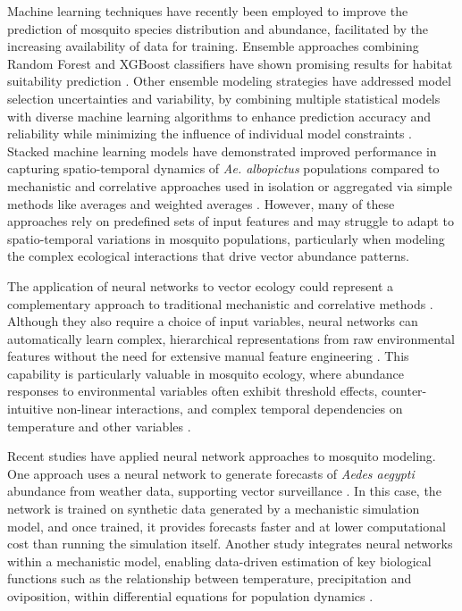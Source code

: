 \documentclass[preprint,12pt]{elsarticle}
\begin{document}
Machine learning techniques have recently been employed to improve the prediction of mosquito species distribution and abundance, facilitated by the increasing availability of data for training. Ensemble approaches combining Random Forest and XGBoost classifiers have shown promising results for habitat suitability prediction \cite{Georgiades2023}. Other ensemble modeling strategies have addressed model selection uncertainties and variability, by combining multiple statistical models with diverse machine learning algorithms to enhance prediction accuracy and reliability while minimizing the influence of individual model constraints \cite{Taheri2025}. Stacked machine learning models have demonstrated improved performance in capturing spatio-temporal dynamics of \emph{Ae. albopictus} populations compared to mechanistic and correlative approaches used in isolation or aggregated via simple methods like averages and weighted averages \cite{dare2025}. However, many of these approaches rely on predefined sets of input features and may struggle to adapt to spatio-temporal variations in mosquito populations, particularly when modeling the complex ecological interactions that drive vector abundance patterns.

The application of neural networks to vector ecology could represent a complementary approach to traditional mechanistic and correlative methods \cite{kraemer2025}. Although they also require a choice of input variables, neural networks can automatically learn complex, hierarchical representations from raw environmental features without the need for extensive manual feature engineering \cite{Yuan2020}. This capability is particularly valuable in mosquito ecology, where abundance responses to environmental variables often exhibit threshold effects, counter-intuitive non-linear interactions, and complex temporal dependencies on temperature and other variables \cite{Mordecai2019, beckjohnson2013}.


Recent studies have applied neural network approaches to mosquito modeling. One approach uses a neural network to generate forecasts of \emph{Aedes aegypti} abundance from weather data, supporting vector surveillance \cite{kinney2024rapid}. In this case, the network is trained on synthetic data generated by a mechanistic simulation model, and once trained, it provides forecasts faster and at lower computational cost than running the simulation itself. Another study integrates neural networks within a mechanistic model, enabling data-driven estimation of key biological functions such as the relationship between temperature, precipitation and oviposition, within differential equations for population dynamics \cite{zhang2024integrating}.
\end{document}
